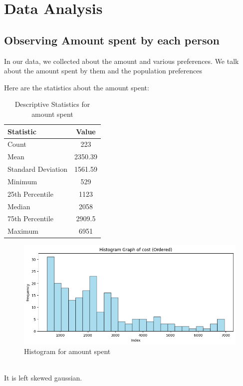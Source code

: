 \documentclass[12pt]{article}
\begin{document}
\section{Data Analysis}
\subsection{Observing Amount spent by each person}
In our data, we collected about the amount and various preferences. We talk about the amount spent by them and the population preferences

Here are the statistics  about the amount spent:
\begin{table}[htbp]
  \centering
  \caption{Descriptive Statistics for amount spent}
  \label{tab:stats}
  \begin{tabular}{@{}lc@{}}
    \toprule
    \textbf{Statistic} & \textbf{Value} \\
    \midrule
    Count & 223 \\
    Mean & 2350.39 \\
    Standard Deviation & 1561.59 \\
    Minimum & 529 \\
    25th Percentile & 1123 \\
    Median & 2058 \\
    75th Percentile & 2909.5 \\
    Maximum & 6951 \\
    \bottomrule
  \end{tabular}
\end{table}
\begin{figure}[htbp]
  \centering
  \includegraphics[width=1.0\textwidth]{Histogram for amount spent.png} %
  \caption{Histogram for amount spent}
  \label{fig:histogram}
\end{figure}
 \\It is left skewed gaussian.
 \\
 \\
 \newpage
\end{document}
